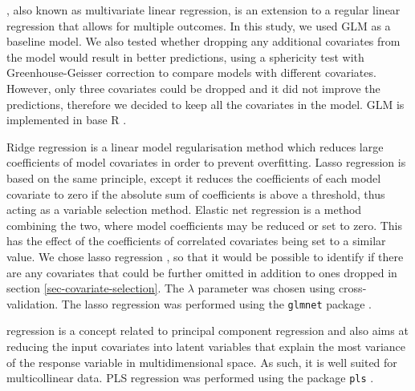 \documentclass[review,authoryear,3p]{elsarticle}
\begin{document}
 \citep{neter_applied_1996}, also known as multivariate linear regression, is an extension to a regular linear regression that allows for multiple outcomes.
In this study, we used \gls{GLM} as a baseline model.
We also tested whether dropping any additional covariates from the model would result in better predictions, using a sphericity test with Greenhouse-Geisser correction to compare models with different covariates.
However, only three covariates could be dropped and it did not improve the predictions, therefore we decided to keep all the covariates in the model.
\Gls{GLM} is implemented in base R \citep{r_2019}.


Ridge regression is a linear model regularisation method which reduces large coefficients of model covariates in order to prevent overfitting.
Lasso regression is based on the same principle, except it reduces the coefficients of each model covariate to zero if the absolute sum of coefficients is above a threshold, thus acting as a variable selection method.
Elastic net regression is a method combining the two, where model coefficients may be reduced or set to zero.
This has the effect of the coefficients of correlated covariates being set to a similar value.
We chose lasso regression \citep{tibshirani_regression_1996}, so that it would be possible to identify if there are any covariates that could be further omitted in addition to ones dropped in section \ref{sec-covariate-selection}.
The $\lambda$ parameter was chosen using cross-validation.
The lasso regression was performed using the \texttt{glmnet} package \citep{glmnet}.


 regression \citep{wold_pls-regression_2001} is a concept related to principal component regression and also aims at reducing the input covariates into latent variables that explain the most variance of the response variable in multidimensional space.
As such, it is well suited for multicollinear data.
\ac{PLS} regression was performed using the package \texttt{pls} \citep{pls}.
\end{document}
